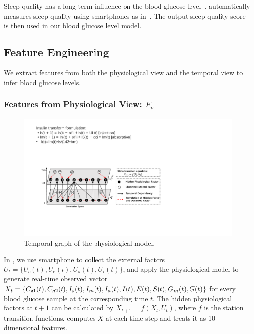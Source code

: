 Sleep quality has a long-term influence on the blood glucose level~\cite{bib:DRCP15:Iwasaki}.
\sysname automatically measures sleep quality using smartphones as in~\cite{bib:UbiComp14:Gu}.
The output sleep quality score is then used in our blood glucose level model.

\subsection{Feature Engineering}
\label{subsec:features}
We extract features from both the physiological view and the temporal view to infer blood glucose levels.

\subsubsection{Features from Physiological View: $F_p$}
\label{subsubsec:physiological}

\begin{figure}[h]
  \centering
  \includegraphics[width=0.9\columnwidth]{./img/Physiological_correlation1.pdf}
  \caption{Temporal graph of the physiological model.}
  \label{fig:phymodel}
\end{figure}

In \sysname, we use smartphone to collect the external factors $U_t=\{U_c(t),U_e(t),U_s(t), U_i(t)\}$, and apply the physiological model to generate real-time observed vector $X_{t}=\{C_{g1}(t), C_{g2}(t),I_{s}(t),I_{m}(t), I_{a}(t), I(t),\\ E(t), S(t),  G_{m}(t), G(t)\}$ for every blood glucose sample at the corresponding time $t$.
The hidden physiological factors at $t+1$ can be calculated by $X_{t+1}=f(X_t, U_t)$, where $f$ is the station transition functions.
\sysname computes $X$ at each time step and treats it as 10-dimensional features.

